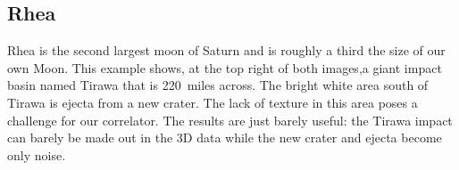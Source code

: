\subsection{Rhea}

Rhea is the second largest moon of Saturn and is roughly a third the
size of our own Moon. This example shows, at the top right of both
images,a giant impact basin named Tirawa that is 220~miles across. The
bright white area south of Tirawa is ejecta from a new crater.  The
lack of texture in this area poses a challenge for our correlator. The
results are just barely useful: the Tirawa impact can barely be made
out in the 3D data while the new crater and ejecta become only noise.

\begin{figure}[p]
\centering
  \hfil
  \\

\end{figure}
